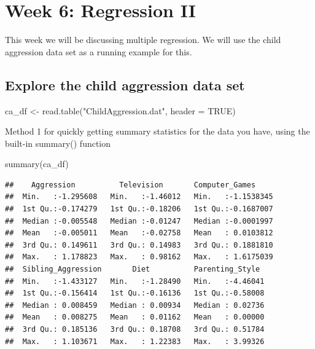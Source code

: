 \documentclass[
]{book}
\newenvironment{Shaded}{\begin{snugshade}}{\end{snugshade}}
\newcommand{\AttributeTok}[1]{\textcolor[rgb]{0.77,0.63,0.00}{#1}}
\newcommand{\ConstantTok}[1]{\textcolor[rgb]{0.00,0.00,0.00}{#1}}
\newcommand{\FunctionTok}[1]{\textcolor[rgb]{0.00,0.00,0.00}{#1}}
\newcommand{\NormalTok}[1]{#1}
\newcommand{\OtherTok}[1]{\textcolor[rgb]{0.56,0.35,0.01}{#1}}
\newcommand{\StringTok}[1]{\textcolor[rgb]{0.31,0.60,0.02}{#1}}
\begin{document}
\hypertarget{week-6-regression-ii}{%
\chapter{Week 6: Regression II}\label{week-6-regression-ii}}

This week we will be discussing multiple regression. We will use the child aggression data set as a running example for this.

\hypertarget{explore-the-child-aggression-data-set}{%
\section{Explore the child aggression data set}\label{explore-the-child-aggression-data-set}}

\begin{Shaded}
\begin{Highlighting}[]
\NormalTok{ca\_df }\OtherTok{\textless{}{-}} \FunctionTok{read.table}\NormalTok{(}\StringTok{"ChildAggression.dat"}\NormalTok{, }\AttributeTok{header =} \ConstantTok{TRUE}\NormalTok{)}
\end{Highlighting}
\end{Shaded}

Method 1 for quickly getting summary statistics for the data you have, using the built-in summary() function

\begin{Shaded}
\begin{Highlighting}[]
\FunctionTok{summary}\NormalTok{(ca\_df)}
\end{Highlighting}
\end{Shaded}

\begin{verbatim}
##    Aggression          Television       Computer_Games      
##  Min.   :-1.295608   Min.   :-1.46012   Min.   :-1.1538345  
##  1st Qu.:-0.174279   1st Qu.:-0.18206   1st Qu.:-0.1687007  
##  Median :-0.005548   Median :-0.01247   Median :-0.0001997  
##  Mean   :-0.005011   Mean   :-0.02758   Mean   : 0.0103812  
##  3rd Qu.: 0.149611   3rd Qu.: 0.14983   3rd Qu.: 0.1881810  
##  Max.   : 1.178823   Max.   : 0.98162   Max.   : 1.6175039  
##  Sibling_Aggression       Diet          Parenting_Style   
##  Min.   :-1.433127   Min.   :-1.28490   Min.   :-4.46041  
##  1st Qu.:-0.156414   1st Qu.:-0.16136   1st Qu.:-0.58008  
##  Median : 0.008459   Median : 0.00934   Median : 0.02736  
##  Mean   : 0.008275   Mean   : 0.01162   Mean   : 0.00000  
##  3rd Qu.: 0.185136   3rd Qu.: 0.18708   3rd Qu.: 0.51784  
##  Max.   : 1.103671   Max.   : 1.22383   Max.   : 3.99326
\end{verbatim}
\end{document}
